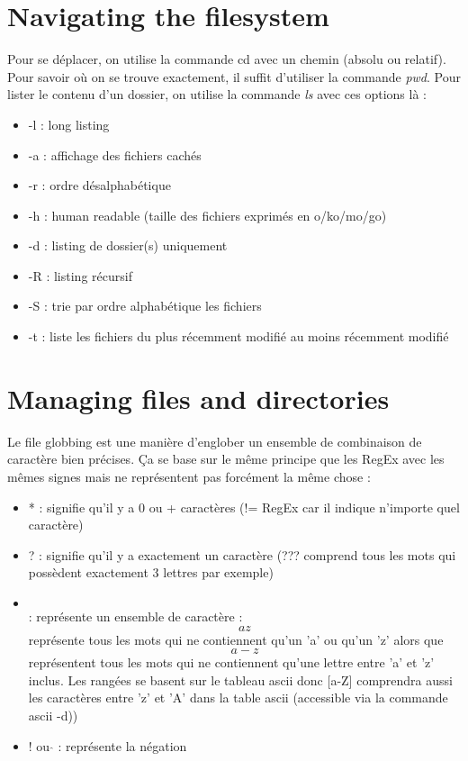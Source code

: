 \documentclass{article}
\begin{document}
\section{Navigating the filesystem}
Pour se déplacer, on utilise la commande cd avec un chemin (absolu ou relatif). Pour savoir où on se trouve exactement, il suffit d'utiliser la commande \textit{pwd}.\newline
Pour lister le contenu d'un dossier, on utilise la commande \textit{ls} avec ces options là :
\begin{itemize}
    \item -l : long listing
    \item -a : affichage des fichiers cachés
    \item -r : ordre désalphabétique
    \item -h : human readable (taille des fichiers exprimés en o/ko/mo/go) 
    \item -d : listing de dossier(s) uniquement
    \item -R : listing récursif
    \item -S : trie par ordre alphabétique les fichiers
    \item -t : liste les fichiers du plus récemment modifié au moins récemment modifié
\end{itemize}


\newpage
\section{Managing files and directories}
Le file globbing est une manière d'englober un ensemble de combinaison de caractère bien précises. Ça se base sur le même principe que les RegEx avec les mêmes signes mais ne représentent pas forcément la même chose :
\begin{itemize}
    \item * : signifie qu'il y a 0 ou + caractères (!= RegEx car il indique n'importe quel caractère)
    \item ? : signifie qu'il y a exactement un caractère (??? comprend tous les mots qui possèdent exactement 3 lettres par exemple)
    \item \[ \] : représente un ensemble de caractère : \[az\] représente tous les mots qui ne contiennent qu'un 'a' ou qu'un 'z' alors que \[a-z\] représentent tous les mots qui ne contiennent qu'une lettre entre 'a' et 'z' inclus. Les rangées se basent sur le tableau ascii donc [a-Z] comprendra aussi les caractères entre 'z' et 'A' dans la table ascii (accessible via la commande ascii -d))
    \item ! ou $\hat{}$ : représente la négation
\end{itemize}
\end{document}
